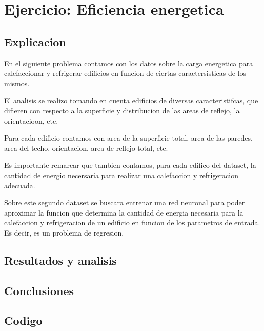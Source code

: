 \section{Ejercicio: Eficiencia energetica}
\subsection{Explicacion}

En el siguiente problema contamos con los datos sobre la carga energetica para calefaccionar y refrigerar edificios en funcion de ciertas caractersisticas de los mismos.

El analisis se realizo tomando en cuenta edificios de diversas caracteristifcas, que difieren con respecto a la superficie y distribucion de las areas de reflejo, la orientacioon, etc.

Para cada edificio contamos con area de la superficie total, area de las paredes, area del techo, orientacion, area de reflejo total, etc.

Es importante remarcar que tambien contamos, para cada edifico del dataset, la cantidad de energio necersaria para realizar una calefaccion y refrigeracion adecuada.

Sobre este segundo dataset se buscara entrenar una red neuronal para poder aproximar la funcion que determina la cantidad de energia necesaria para
la calefaccion y refrigeracion de un edificio en funcion de los parametros de entrada. Es decir, es un problema de regresion.



\subsection{Resultados y analisis}
\subsection{Conclusiones}
\subsection{Codigo}